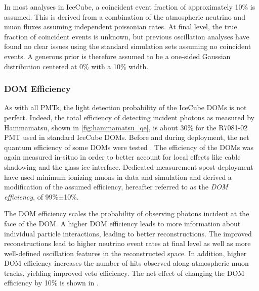 In most analyses in IceCube, a coincident event fraction of approximately 10\% is assumed. 
This is derived from a combination of the  atmospheric neutrino and muon fluxes assuming independent poissonian rates.
At final level, the true fraction of coincident events is unknown, but previous oscillation analyses have found no clear issues using the standard simulation sets assuming no coincident events.
A generous prior is therefore assumed to be a one-sided Gaussian distribution centered at 0\% with a 10\% width. 

\subsubsection{DOM Efficiency}
\label{subsubsec:domeff}
As with all PMTs, the light detection probability of the IceCube DOMs is not perfect.
Indeed, the total efficiency of detecting incident photons as measured by Hammamatsu, shown in \ref{fig:hammamatsu_qe}, is about 30\% for the R7081-02 PMT used in standard IceCube DOMs. 
Before and during deployment, the net quantum efficiency of some DOMs were tested .
The efficiency of the DOMs was again measured in-situo  in order to better account for local effects like cable shadowing and the glass-ice interface.
Dedicated measurement spost-deployment have used minimum ionizing muons in data and simulation and derived 
a modification of the assumed efficiency, hereafter referred to as the \emph{DOM efficiency}, of 99\%$\pm$10\%. 

The DOM efficiency scales the probability of observing photons incident at the face of the DOM.
A higher DOM efficiency leads to more information about individual particle interactions, leading to better reconstructions.
The improved reconstructions lead to higher neutrino event rates at final level as well as more well-defined oscillation features in the reconstructed space.
In addition, higher DOM efficiency increases the number of hits observed along atmospheric muon tracks, yielding improved veto efficiency.
The net effect of changing the DOM efficiency by 10\% is shown in .

